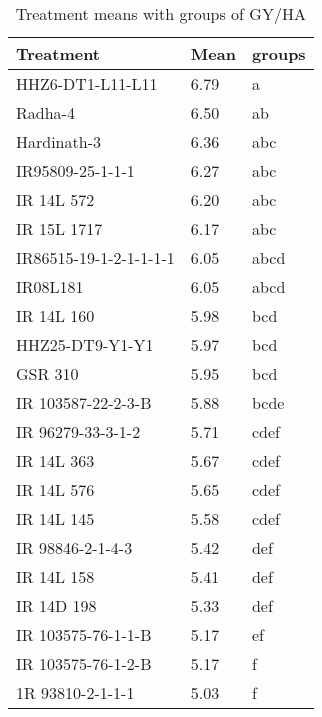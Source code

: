 \documentclass[]{article}
\begin{document}
\begin{longtable}{lll}
\caption{\label{tab:two-fac-groups-tab2}Treatment means with groups of GY/HA}\\
\toprule
Treatment & Mean & groups\\
\midrule
\rowcolor{gray!6}  HHZ6-DT1-L11-L11 & 6.79 & a\\
Radha-4 & 6.50 & ab\\
\rowcolor{gray!6}  Hardinath-3 & 6.36 & abc\\
IR95809-25-1-1-1 & 6.27 & abc\\
\rowcolor{gray!6}  IR 14L 572 & 6.20 & abc\\
\addlinespace
IR 15L 1717 & 6.17 & abc\\
\rowcolor{gray!6}  IR86515-19-1-2-1-1-1-1 & 6.05 & abcd\\
IR08L181 & 6.05 & abcd\\
\rowcolor{gray!6}  IR 14L 160 & 5.98 & bcd\\
HHZ25-DT9-Y1-Y1 & 5.97 & bcd\\
\addlinespace
\rowcolor{gray!6}  GSR 310 & 5.95 & bcd\\
IR 103587-22-2-3-B & 5.88 & bcde\\
\rowcolor{gray!6}  IR 96279-33-3-1-2 & 5.71 & cdef\\
IR 14L 363 & 5.67 & cdef\\
\rowcolor{gray!6}  IR 14L 576 & 5.65 & cdef\\
\addlinespace
IR 14L 145 & 5.58 & cdef\\
\rowcolor{gray!6}  IR 98846-2-1-4-3 & 5.42 & def\\
IR 14L 158 & 5.41 & def\\
\rowcolor{gray!6}  IR 14D 198 & 5.33 & def\\
IR 103575-76-1-1-B & 5.17 & ef\\
\addlinespace
\rowcolor{gray!6}  IR 103575-76-1-2-B & 5.17 & f\\
1R 93810-2-1-1-1 & 5.03 & f\\
\bottomrule
\end{longtable}
\endgroup{}
\begingroup\fontsize{12}{14}\selectfont
\end{document}
